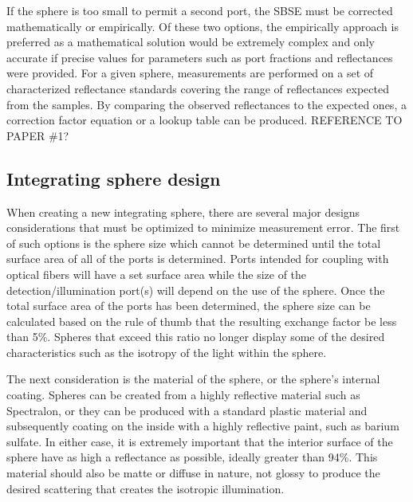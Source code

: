 If the sphere is too small to permit a second port, the SBSE must be corrected mathematically or empirically. Of these two options, the empirically approach is preferred as a mathematical solution would be extremely complex and only accurate if precise values for parameters such as port fractions and reflectances were provided. For a given sphere, measurements are performed on a set of characterized reflectance standards covering the range of reflectances expected from the samples. By comparing the observed reflectances to the expected ones, a correction factor equation or a lookup table can be produced. REFERENCE TO PAPER \#1?

\subsection{Integrating sphere design}
When creating a new integrating sphere, there are several major designs considerations that must be optimized to minimize measurement error. The first of such options is the sphere size which cannot be determined until the total surface area of all of the ports is determined. Ports intended for coupling with optical fibers will have a set surface area while the size of the detection/illumination port(s) will depend on the use of the sphere. Once the total surface area of the ports has been determined, the sphere size can be calculated based on the rule of thumb that the resulting exchange factor be less than 5\%.\cite{Labsphereb} Spheres that exceed this ratio no longer display some of the desired characteristics such as the isotropy of the light within the sphere.

The next consideration is the material of the sphere, or the sphere's internal coating. Spheres can be created from a highly reflective material such as Spectralon, or they can be produced with a standard plastic material and subsequently coating on the inside with a highly reflective paint, such as barium sulfate. In either case, it is extremely important that the interior surface of the sphere have as high a reflectance as possible, ideally greater than 94\%. This material should also be matte or diffuse in nature, not glossy to produce the desired scattering that creates the isotropic illumination.

